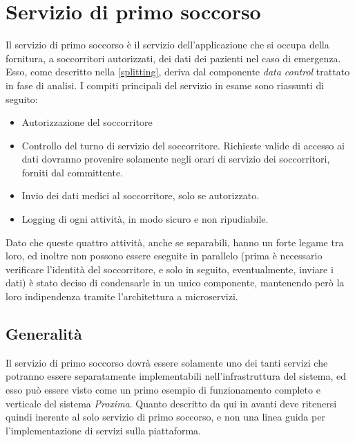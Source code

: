 \documentclass[a4paper,12pt]{report}
\begin{document}
\section{Servizio di primo soccorso}
Il servizio di primo soccorso è il servizio dell'applicazione che si occupa della fornitura, a soccorritori autorizzati, dei dati dei pazienti nel caso di emergenza. Esso, come descritto nella \autoref{splitting}, deriva dal componente \emph{data control} trattato in fase di analisi. I compiti principali del servizio in esame sono riassunti di seguito: 
\begin{itemize}
	\item Autorizzazione del soccorritore
	\item Controllo del turno di servizio del soccorritore. Richieste valide di accesso ai dati dovranno provenire solamente negli orari di servizio dei soccorritori, forniti dal committente. 
	\item Invio dei dati medici al soccorritore, solo se autorizzato.
	\item Logging di ogni attività, in modo sicuro e non ripudiabile.
\end{itemize}
Dato che queste quattro attività, anche se separabili, hanno un forte legame tra loro, ed inoltre non possono essere eseguite in parallelo (prima è necessario verificare l'identità del soccorritore, e solo in seguito, eventualmente, inviare i dati) è stato deciso di condensarle in un unico componente, mantenendo però la loro indipendenza tramite l'architettura a microservizi. 

\subsection{Generalità}
Il servizio di primo soccorso dovrà essere solamente uno dei tanti servizi che potranno essere separatamente implementabili nell'infrastruttura del sistema, ed esso può essere visto come un primo esempio di funzionamento completo e verticale del sistema \emph{Proxima}. Quanto descritto da qui in avanti deve ritenersi quindi inerente al solo servizio di primo soccorso, e non una linea guida per l'implementazione di servizi sulla piattaforma.
\end{document}
